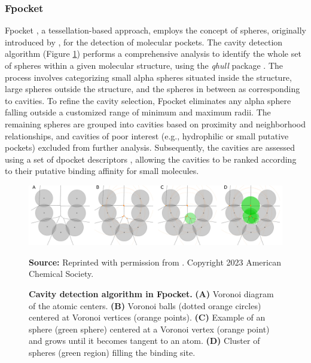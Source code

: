 \documentclass[Ingles]{phdthesis}
\def\eg{e.g.\onedot}
\begin{document}
\subsubsection{Fpocket}

Fpocket \cite{fpocket}, a tessellation-based approach, employs the concept of \textalpha\space spheres, originally introduced by \cite{liang1998}, for the detection of molecular pockets. The cavity detection algorithm (Figure \ref{fig:fpocket-schema}) performs a comprehensive analysis to identify the whole set of \textalpha\space spheres within a given molecular structure, using the \textit{qhull} package \cite{qhull}. The process involves categorizing small alpha spheres situated inside the structure, large spheres outside the structure, and the spheres in between as corresponding to cavities. To refine the cavity selection, Fpocket eliminates any alpha sphere falling outside a customized range of minimum and maximum radii. The remaining \textalpha\space spheres are grouped into cavities based on proximity and neighborhood relationships, and cavities of poor interest (\eg, hydrophilic or small putative pockets) excluded from further analysis. Subsequently, the cavities are assessed using a set of dpocket descriptors \cite{fpocket}, allowing the cavities to be ranked according to their putative binding affinity for small molecules. 

\begin{figure}[ht]
  \centerline{\includegraphics[scale=0.9]{images/fpocket-schema.png}}
  \centerline{\tiny{\textbf{Source:} Reprinted with permission from \cite{guerra2023B}. Copyright 2023 American Chemical Society.}}
  \caption[Cavity detection algorithm in Fpocket]{\textbf{Cavity detection algorithm in Fpocket.} \textbf{(A)} Voronoi diagram of the atomic centers. \textbf{(B)} Voronoi balls (dotted orange circles) centered at Voronoi vertices (orange points). \textbf{(C)} Example of an \textalpha\space sphere (green sphere) centered at a Voronoi vertex (orange point) and grows until it becomes tangent to an atom. \textbf{(D)} Cluster of \textalpha\space spheres (green region) filling the binding site.}
  \label{fig:fpocket-schema}
\end{figure}
\end{document}
